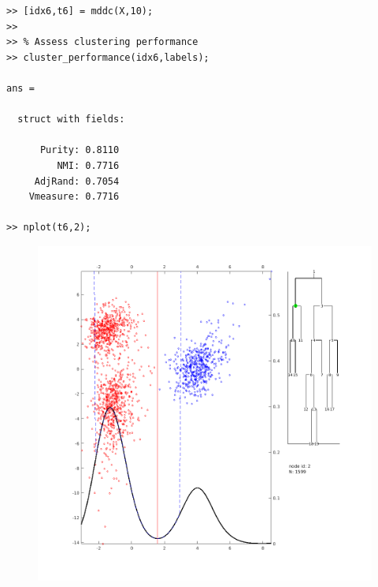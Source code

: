 \documentclass{book}
\begin{document}
\begin{verbatim}
>> [idx6,t6] = mddc(X,10);
>> 
>> % Assess clustering performance
>> cluster_performance(idx6,labels);

ans = 

  struct with fields:

      Purity: 0.8110
         NMI: 0.7716
     AdjRand: 0.7054
    Vmeasure: 0.7716

>> nplot(t6,2);
\end{verbatim}


\begin{figure}
%
\begin{latexonly}
%
\begin{center}
%
\includegraphics[scale=0.3]{figures/mddc1.png}
%
\end{center}
\end{latexonly}
%
\begin{htmlonly}
%

\end{htmlonly}
\end{figure}
\end{document}
